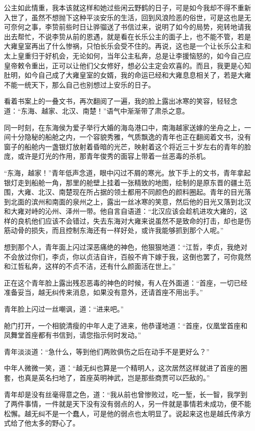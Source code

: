 公主如此情重，我本该就这样和她过些闲云野鹤的日子，可是如今我却不得不重新入世了，虽然不想抛下这种平淡安乐的生活，回到风浪险恶的俗世，可是这也是无可奈何之事，李贽前些时日让骅骝送了书信过来，说明了如今的局势，宛转地请我出去帮忙，不说李贽从前的恩遇，就是看在长乐公主的面子上，也不能不管，若是大雍皇室再出了什么惨祸，只怕长乐会受不住的。再说，这也是一个让长乐公主和太上皇重归于好机会，无论如何，当年公主私奔，总是让李援恼怒的，如今自己应皇帝敕令重出，正可以让他们父女修好，想必公主定会欢喜的。而且，我更是心知肚明，如今自己成了大雍皇室的女婿，我的命运已经和大雍息息相关了，若是大雍不能一统天下，那么自己也别想过上安乐的日子。

看着书案上的一叠文书，再次翻阅了一遍，我的脸上露出冰寒的笑容，轻轻念道：“东海、越家、北汉、南楚！”语气中渐渐带了肃杀之意。

同一时刻，在东海侯为爱子举行大婚的海岛港口中，南海越家送嫁的坐舟之上，一间十分隐秘的船舱之内，一个容貌秀雅，气质飘逸的青年也正在翻阅着文书，没有窗子的船舱内一盏银灯放射着昏暗的光芒，映射着这个将近三十岁左右的青年的脸庞，或许是灯光的作用，那青年俊秀的面容上带着一丝恶毒的杀机。

“东海，越家！”青年低声念道，眼中闪过不屑的寒光。放下手上的文书，青年拿起银灯走到船舱一角，那里的舱壁上挂着一张精致的地图，绘制的是原东晋的疆土范围，大雍、北汉、南楚现在所占据的领土都用不同颜色的颜料圈起。青年的目光落到北面的滨州和南面的泉州之上，露出一丝冰寒的笑意，然后他的目光又落到北汉和大雍对峙的沁州、泽州一带。他自言自语道：“北汉应该会趁机进攻大雍的，这样的良机他们应该不会错过，失去东海对大雍来说虽然不是致命的打击，却也是伤筋动骨的损失，而且控制东海还有一样好处，或许我能够抓到那个人呢。”

想到那个人，青年面上闪过深恶痛绝的神色，他狠狠地道：“江哲，李贞，我绝对不会放过你们，李贞，你以贞洁自许，百般不肯下嫁于我，这倒也罢了，可你竟然和江哲私奔，这样的不贞不洁，还有什么颜面活在世上。”

正在这个青年脸上露出残忍恶毒的神色的时候，有人在外面道：“首座，一切已经准备妥当，越无纠传来消息，如果没有意外，还请首座不用出手。”

青年脸上闪过一丝嘲讽，道：“进来吧。”

舱门打开，一个相貌清瘦的中年人走了进来，他恭谨地道：“首座，仪凰堂首座和凤舞堂首座都有书信到，请您指示何时发动。”

青年淡淡道：“急什么，等到他们两败俱伤之后在动手不是更好么？”

中年人微微一笑，道：“越无纠也算是一个精明人，这次居然这样就进了首座的圈套，也真是英名扫地了，首座英明神武，岂是那些商贾可以匹敌的。”

青年却是没有丝毫得意之色，道：“我从前也曾惨败过，吃一堑，长一智，我学到了两件事情，一件就是天下没有没有弱点的人，另一件就是事情若未成功，便不能松懈。越无纠不是一个蠢人，可是他的弱点也太明显了。说起来这也是越氏传承方式给了他太多的野心了。

